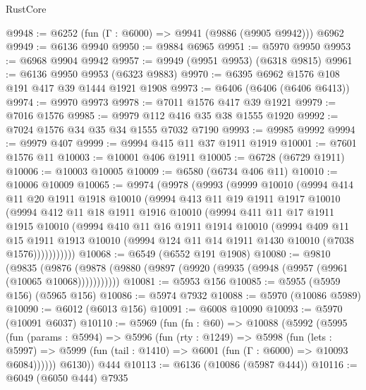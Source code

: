 \begin{lexlean}{RustCore}
\begin{coremodule}
@9948 := @6252 (fun (Γ : @6000) => @9941 (@9886 (@9905 @9942))) @6962
@9949 := @6136 @9940
@9950 := @9884 @6965
@9951 := @5970 @9950
@9953 := @6968 @9904 @9942
@9957 := @9949 (@9951 @9953) (@6318 @9815)
@9961 := @6136 @9950 @9953 (@6323 @9883)
@9970 := @6395 @6962 @1576 @108 @191 @417 @39 @1444 @1921 @1908
@9973 := @6406 (@6406 (@6406 @6413))
@9974 := @9970 @9973
@9978 := @7011 @1576 @417 @39 @1921
@9979 := @7016 @1576
@9985 := @9979 @112 @416 @35 @38 @1555 @1920
@9992 := @7024 @1576 @34 @35 @34 @1555 @7032 @7190
@9993 := @9985 @9992
@9994 := @9979 @407
@9999 := @9994 @415 @11 @37 @1911 @1919
@10001 := @7601 @1576 @11
@10003 := @10001 @406 @1911
@10005 := @6728 (@6729 @1911)
@10006 := @10003 @10005
@10009 := @6580 (@6734 @406 @11)
@10010 := @10006 @10009
@10065 := @9974
    (@9978
      (@9993
        (@9999
          @10010
          (@9994
            @414
            @11
            @20
            @1911
            @1918
            @10010
            (@9994
              @413
              @11
              @19
              @1911
              @1917
              @10010
              (@9994
                @412
                @11
                @18
                @1911
                @1916
                @10010
                (@9994
                  @411
                  @11
                  @17
                  @1911
                  @1915
                  @10010
                  (@9994
                    @410
                    @11
                    @16
                    @1911
                    @1914
                    @10010
                    (@9994
                      @409
                      @11
                      @15
                      @1911
                      @1913
                      @10010
                      (@9994 @124 @11 @14 @1911 @1430 @10010 (@7038 @1576)))))))))))
@10068 := @6549 (@6552 @191 @1908)
@10080 := @9810
    (@9835 (@9876 (@9878 (@9880 (@9897 (@9920 (@9935 (@9948 (@9957 (@9961 (@10065 @10068)))))))))))
@10081 := @5953 @156
@10085 := @5955 (@5959 @156) (@5965 @156)
@10086 := @5974 @7932
@10088 := @5970 (@10086 @5989)
@10090 := @6012 (@6013 @156)
@10091 := @6008 @10090
@10093 := @5970 (@10091 @6037)
@10110 := @5969
    (fun (fn : @60) =>
    @10088
      (@5992
        (@5995
          (fun (params : @5994) =>
          @5996
            (fun (rty : @1249) =>
            @5998
              (fun (lets : @5997) =>
              @5999 (fun (tail : @1410) => @6001 (fun (Γ : @6000) => @10093 @6084))))))
        @6130))
    @444
@10113 := @6136 (@10086 (@5987 @444))
@10116 := @6049 (@6050 @444) @7935

\end{coremodule}
\end{lexlean}
